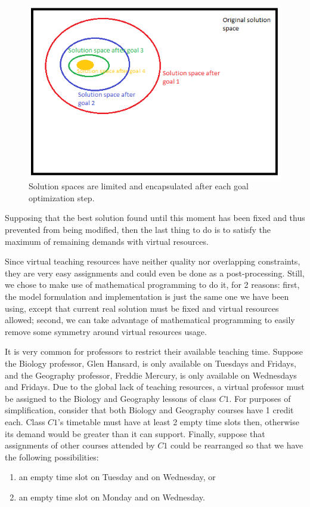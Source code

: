 \begin{figure}[h]
\includegraphics[scale=0.6]{figures/goalProgSpace.png}
\centering
\caption{Solution spaces are limited and encapsulated after each goal optimization step.}
\end{figure}




Supposing that the best solution found until this moment has been fixed and thus prevented from being modified, then the last thing to do is to satisfy the maximum of remaining demands with virtual resources. 

Since virtual teaching resources have neither quality nor overlapping constraints, they are very easy assignments and could even be done as a post-processing. Still, we chose to make use of mathematical programming to do it, for 2 reasons: first, the model formulation and implementation is just the same one we have been using, except that current real solution must be fixed and virtual resources allowed; second, we can take advantage of mathematical programming to easily remove some symmetry around virtual resources usage.

It is very common for professors to restrict their available teaching time. Suppose the Biology professor, Glen Hansard, is only available on Tuesdays and Fridays, and the Geography professor, Freddie Mercury, is only available on Wednesdays and Fridays. Due to the global lack of teaching resources, a virtual professor must be assigned to the Biology and Geography lessons of class $C1$. For purposes of simplification, consider that both Biology and Geography courses have 1 credit each. Class $C1$'s timetable must have at least 2 empty time slots then, otherwise its demand would be greater than it can support. Finally, suppose that assignments of other courses attended by $C1$ could be rearranged so that we have the following possibilities:
\begin{enumerate}
\item an empty time slot on Tuesday and on Wednesday, or
\item an empty time slot on Monday and on Wednesday.
\end{enumerate}


